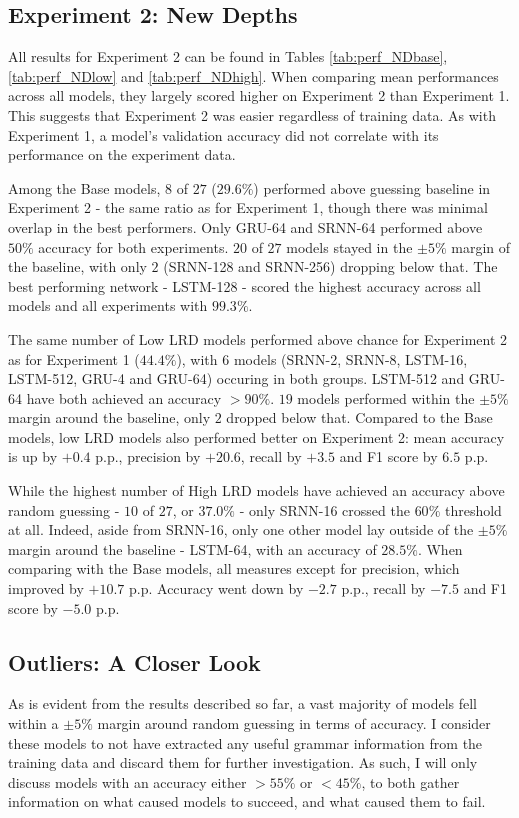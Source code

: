 \subsection{Experiment 2: New Depths}\label{resultsND}
All results for Experiment 2 can be found in Tables \ref{tab:perf_NDbase}, \ref{tab:perf_NDlow} and \ref{tab:perf_NDhigh}. When comparing mean performances across all models, they largely scored higher on Experiment 2 than Experiment 1. This suggests that Experiment 2 was easier regardless of training data. As with Experiment 1, a model's validation accuracy did not correlate with its performance on the experiment data.



Among the Base models, $8$ of $27$ ($29.6\%$) performed above guessing baseline in Experiment 2 - the same ratio as for Experiment 1, though there was minimal overlap in the best performers. Only GRU-64 and SRNN-64 performed above $50\%$ accuracy for both experiments. $20$ of $27$ models stayed in the $\pm 5\%$ margin of the baseline, with only $2$ (SRNN-128 and SRNN-256) dropping below that. The best performing network - LSTM-128 - scored the highest accuracy across all models and all experiments with $99.3\%$.



The same number of Low LRD models performed above chance for Experiment 2 as for Experiment 1 ($44.4\%$), with $6$ models (SRNN-2, SRNN-8, LSTM-16, LSTM-512, GRU-4 and GRU-64) occuring in both groups. LSTM-512 and GRU-64 have both achieved an accuracy $>90\%$. $19$ models performed within the $\pm 5\%$ margin around the baseline, only $2$ dropped below that. Compared to the Base models, low LRD models also performed better on Experiment 2: mean accuracy is up by $+0.4$ p.p., precision by $+20.6$, recall by $+3.5$ and F1 score by $6.5$ p.p.


While the highest number of High LRD models have achieved an accuracy above random guessing - $10$ of $27$, or $37.0\%$ - only SRNN-16 crossed the $60\%$ threshold at all. Indeed, aside from SRNN-16, only one other model lay outside of the $\pm 5\%$ margin around the baseline - LSTM-64, with an accuracy of $28.5\%$. When comparing with the Base models, all measures except for precision, which improved by $+10.7$ p.p. Accuracy went down by $-2.7$ p.p., recall by $-7.5$ and F1 score by $-5.0$ p.p.

\subsection{Outliers: A Closer Look}
As is evident from the results described so far, a vast majority of models fell within a $\pm 5\%$ margin around random guessing in terms of accuracy. I consider these models to not have extracted any useful grammar information from the training data and discard them for further investigation. As such, I will only discuss models with an accuracy either $> 55\%$ or $< 45\%$, to both gather information on what caused models to succeed, and what caused them to fail.

